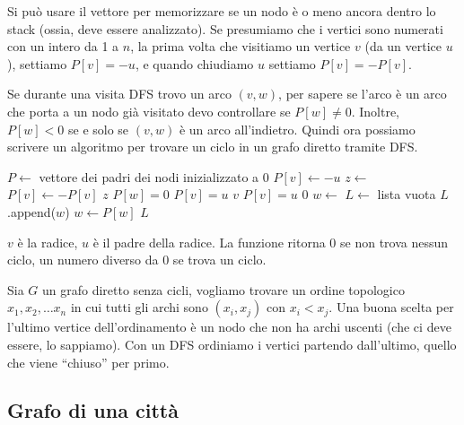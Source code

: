 Si pu\`o usare il vettore per memorizzare se un nodo \`e o meno ancora dentro lo stack (ossia, deve essere analizzato). Se presumiamo che i vertici sono numerati con un intero da 1 a $n$, la prima volta che visitiamo un vertice $v$ (da un vertice $u$), settiamo $P[v] = -u$, e quando chiudiamo $u$ settiamo $P[v] = - P[v]$.

Se durante una visita DFS trovo un arco $(v,w)$, per sapere se l'arco \`e un arco che porta a un nodo gi\`a visitato devo controllare se $P[w] \neq 0$. Inoltre, $P[w] < 0$ se e solo se $(v,w)$ \`e un arco all'indietro. Quindi ora possiamo scrivere un algoritmo per trovare un ciclo in un grafo diretto tramite DFS.

\begin{algorithm}
\caption{Visita DFS per trovare un ciclo}
\begin{algorithmic}[1]
\State $P \gets$ vettore dei padri dei nodi inizializzato a 0
    \State $P[v] \gets -u$
            \State $z \gets $ 
                \State $P[v] \gets - P[v]$
                \State \Return $z$
            \EndIf
            \State $P[w] = 0$
            \State $P[v] = u$
            \State \Return $v$
        \EndIf
        \State $P[v] = u$
        \State \Return $0$
    \EndFor
\EndFunction
\State $w \gets$ 
\State $L \gets$ lista vuota
    \State $L$.append($w$)
    \State $w \gets P[w]$
\EndWhile
\State \Return $L$
\end{algorithmic}
\end{algorithm}

$v$ \`e la radice, $u$ \`e il padre della radice. La funzione ritorna 0 se non trova nessun ciclo, un numero diverso da 0 se trova un ciclo.

Sia $G$ un grafo diretto senza cicli, vogliamo trovare un ordine topologico $x_1, x_2, \dots x_n$ in cui tutti gli archi sono $(x_i, x_j)$ con $x_i < x_j$. Una buona scelta per l'ultimo vertice dell'ordinamento \`e un nodo che non ha archi uscenti (che ci deve essere, lo sappiamo). Con un DFS ordiniamo i vertici partendo dall'ultimo, quello che viene ``chiuso'' per primo.

\subsection{Grafo di una citt\`a}


